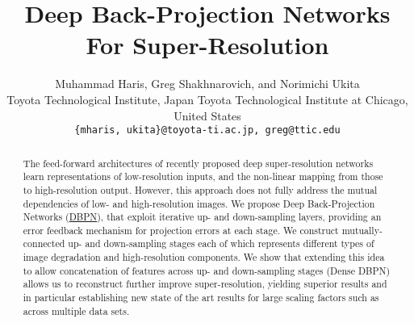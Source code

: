 \documentclass[10pt,twocolumn,letterpaper]{article}
\begin{document}
\newcommand{\gscom}[1]{\textcolor{magenta}{\small {#1}}}

\newcommand{\changeurlcolor}[1]{\hypersetup{urlcolor=#1}}  

\title{Deep Back-Projection Networks For Super-Resolution}

\author{Muhammad Haris, Greg Shakhnarovich, and Norimichi Ukita\\
Toyota Technological Institute, Japan Toyota Technological Institute at Chicago, United States\\
{\tt\small \{mharis, ukita\}@toyota-ti.ac.jp, greg@ttic.edu}
}

\maketitle


\begin{abstract}
The feed-forward architectures of recently proposed deep
super-resolution networks learn representations of low-resolution
inputs, and the non-linear mapping from those to high-resolution
output. However, this approach does not fully address the mutual
dependencies of low- and high-resolution images. We propose Deep
Back-Projection Networks (\changeurlcolor{blue}\href{http://www.toyota-ti.ac.jp/Lab/Denshi/iim/members/muhammad.haris/projects/DBPN.html}{DBPN}), that exploit iterative up- and down-sampling
layers, providing an error feedback mechanism for projection errors at
each stage. We construct mutually-connected up- and down-sampling
stages each of which represents different types of image degradation
and high-resolution components. We show that extending this idea to
allow concatenation of features across up- and down-sampling stages 
(Dense DBPN) allows us to reconstruct further improve
super-resolution, yielding superior results and in particular
establishing new state of the art results for large scaling factors
such as  across multiple data sets. 
\end{abstract}
\end{document}
